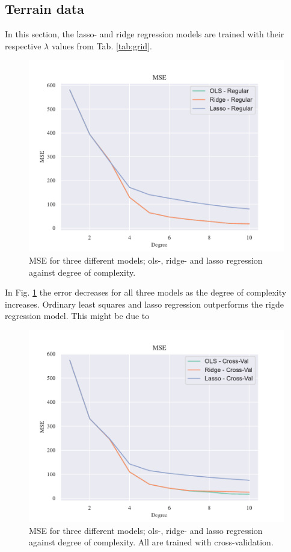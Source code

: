 \subsection{Terrain data}

In this section, the lasso- and ridge regression models are trained with their respective $\lambda$ values from Tab. \ref{tab:grid}. 

\begin{figure}[h!]
    \centering
    \includegraphics[width=1\linewidth]{project_1_alt/figures/figures_in_report/All_Terrain_OLS.pdf}
    \caption{MSE for three different models; ols-, ridge- and lasso regression against degree of complexity.}
    \label{all_terrain_OLS}
\end{figure}

In Fig. \ref{all_terrain_OLS} the error decreases for all three models as the degree of complexity increases. Ordinary least squares and lasso regression outperforms the rigde regression model. This might be due to 

\begin{figure}[h!]
    \centering
    \includegraphics[width=1\linewidth]{project_1_alt/figures/figures_in_report/All_Terrain_CV_k10.pdf}
    \caption{MSE for three different models; ols-, ridge- and lasso regression against degree of complexity. All are trained with cross-validation.}
    \label{all_terrain_cv}
\end{figure}

